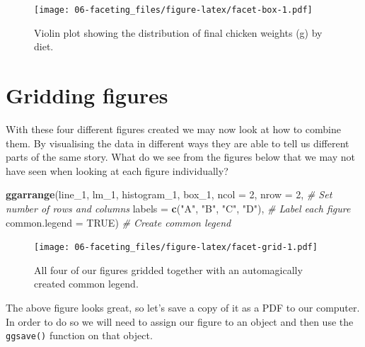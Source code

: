 \documentclass[
]{book}
\newenvironment{Shaded}{\begin{snugshade}}{\end{snugshade}}
\newcommand{\CommentTok}[1]{\textcolor[rgb]{0.56,0.35,0.01}{\textit{#1}}}
\newcommand{\DataTypeTok}[1]{\textcolor[rgb]{0.13,0.29,0.53}{#1}}
\newcommand{\DecValTok}[1]{\textcolor[rgb]{0.00,0.00,0.81}{#1}}
\newcommand{\KeywordTok}[1]{\textcolor[rgb]{0.13,0.29,0.53}{\textbf{#1}}}
\newcommand{\NormalTok}[1]{#1}
\newcommand{\OtherTok}[1]{\textcolor[rgb]{0.56,0.35,0.01}{#1}}
\newcommand{\StringTok}[1]{\textcolor[rgb]{0.31,0.60,0.02}{#1}}
\begin{document}
\begin{figure}
\centering
\texttt{[image: 06-faceting\_files/figure-latex/facet-box-1.pdf]}
\caption{\label{fig:facet-box}Violin plot showing the distribution of final chicken weights (g) by diet.}
\end{figure}

\hypertarget{gridding-figures}{%
\section{Gridding figures}\label{gridding-figures}}

With these four different figures created we may now look at how to combine them. By visualising the data in different ways they are able to tell us different parts of the same story. What do we see from the figures below that we may not have seen when looking at each figure individually?

\begin{Shaded}
\begin{Highlighting}[]
\KeywordTok{ggarrange}\NormalTok{(line\_}\DecValTok{1}\NormalTok{, lm\_}\DecValTok{1}\NormalTok{, histogram\_}\DecValTok{1}\NormalTok{, box\_}\DecValTok{1}\NormalTok{, }
          \DataTypeTok{ncol =} \DecValTok{2}\NormalTok{, }\DataTypeTok{nrow =} \DecValTok{2}\NormalTok{, }\CommentTok{\# Set number of rows and columns}
          \DataTypeTok{labels =} \KeywordTok{c}\NormalTok{(}\StringTok{"A"}\NormalTok{, }\StringTok{"B"}\NormalTok{, }\StringTok{"C"}\NormalTok{, }\StringTok{"D"}\NormalTok{), }\CommentTok{\# Label each figure}
          \DataTypeTok{common.legend =} \OtherTok{TRUE}\NormalTok{) }\CommentTok{\# Create common legend}
\end{Highlighting}
\end{Shaded}

\begin{figure}
\centering
\texttt{[image: 06-faceting\_files/figure-latex/facet-grid-1.pdf]}
\caption{\label{fig:facet-grid}All four of our figures gridded together with an automagically created common legend.}
\end{figure}

The above figure looks great, so let's save a copy of it as a PDF to our computer. In order to do so we will need to assign our figure to an object and then use the \texttt{ggsave()} function on that object.
\end{document}
